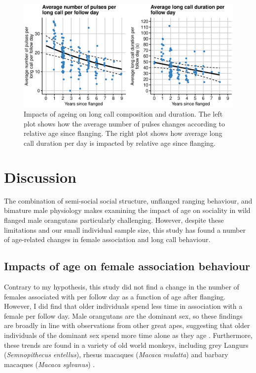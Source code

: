 





\begin{figure}
\centering
\includegraphics[width=1\linewidth]{Chapter4/Figs/combined_plot.eps}
\caption{Impacts of ageing on long call composition and duration. The left plot shows how the average number of pulses changes according to relative age since flanging. The right plot shows how average long call duration per day is impacted by relative age since flanging.}
\label{fig:Flanged_male_association_between_Suaq_and_Tuanan}
\end{figure}



\section{Discussion}

The combination of semi-social social structure, unflanged ranging behaviour, and bimature male physiology makes examining the impact of age on sociality in wild flanged male orangutans particularly challenging. However, despite these limitations and our small individual sample size, this study has found a number of age-related changes in female association and long call behaviour.

\subsection{Impacts of age on female association behaviour}

Contrary to my hypothesis, this study did not find a change in the number of females associated with per follow day as a function of age after flanging. However, I did find that older individuals spend less time in association with a female per follow day. Male orangutans are the dominant sex, so these findings are broadly in line with observations from other great apes, suggesting that older individuals of the dominant sex spend more time alone as they age \citep{Rosati.2020}.  Furthermore, these trends are found in a variety of old world monkeys, including grey Langurs (\textit{Semnopithecus entellus}), rhesus macaques (\textit{Macaca mulatta}) and barbary macaques (\textit{Macaca sylvanus}) \citep{Hrdy.1976, Corr.2003, Almeling.2017, Siracusa.2022}.

